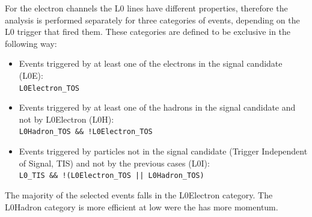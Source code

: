For the electron channels the L0 lines have different properties, therefore the analysis 
is performed separately for three categories of events, depending on the L0 trigger that fired 
them. These categories are defined to be exclusive in the following way:
%
\begin{itemize}
\item Events triggered by at least one of the electrons in the signal candidate (L0E): \\
{\centering \verb!L0Electron_TOS! }
\item Events triggered by at least one of the hadrons in the signal candidate and not by L0Electron (L0H): \\
{\centering \verb|L0Hadron_TOS && !L0Electron_TOS| }
\item Events triggered by particles not in the signal candidate (Trigger Independent of Signal, TIS) and not by the previous cases (L0I): \\
{\centering \verb|L0_TIS && !(L0Electron_TOS |\verb!|| L0Hadron_TOS)! }
\end{itemize}

The majority of the selected events falls in the L0Electron category.
The L0Hadron category is more efficient at low \qsq were the \Kstarz has more momentum.

